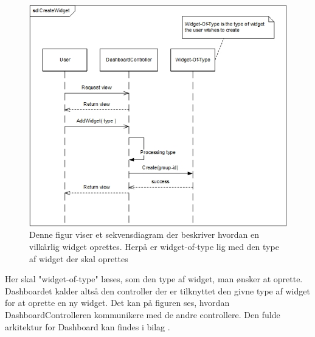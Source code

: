 \begin{figure}[H]
    \centering
    \includegraphics[width=1\textwidth]{09_Arkitektur/Dashboard/CreateWidgetSekvensjpg.jpg}
    \caption{Denne figur viser et sekvensdiagram der beskriver hvordan en vilkårlig widget oprettes. Herpå er widget-of-type lig med den type af widget der skal oprettes}
    \label{fig:CreateNewWidgetSeq}
\end{figure}

Her skal "widget-of-type" læses, som den type af widget, man ønsker at oprette. Dashboardet kalder altså den controller der er tilknyttet den givne type af widget for at oprette en ny widget. Det kan på figuren ses, hvordan DashboardControlleren kommunikere med de andre controllere. Den fulde arkitektur for Dashboard kan findes i bilag \cite{ArkitekturDashboard}.

